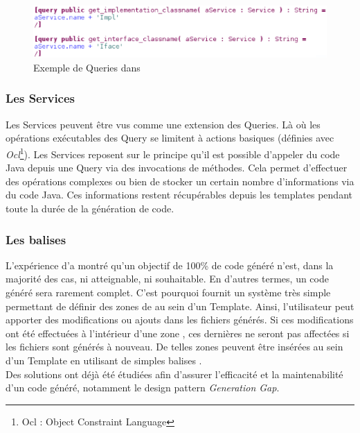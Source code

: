 \begin{figure}[htb]
  \centering
  \includegraphics[scale=0.6]{img/screen_query.eps}
  \caption{Exemple de Queries dans \kwacceleo{}}
  \label{fig:acc_module}
\end{figure}

\subsubsection{Les Services}

Les Services peuvent être vus comme une extension des Queries. Là où les opérations exécutables des Query se limitent à actions basiques (définies avec \textit{Ocl}\footnote{Ocl : Object Constraint Language}). Les Services reposent sur le principe qu'il est possible d'appeler du code Java depuis une Query via des invocations de méthodes. Cela permet d'effectuer des opérations complexes ou bien de stocker un certain nombre d'informations via du code Java. Ces informations restent récupérables depuis les templates pendant toute la durée de la génération de code.

\subsubsection{Les balises }

L'expérience d'\kwobeo a montré qu'un objectif de 100\% de code généré n'est, dans la majorité des cas, ni atteignable, ni souhaitable.
En d'autres termes, un code généré sera rarement complet. C'est pourquoi \kwacceleo fournit un système très simple permettant de définir des zones de  au sein d'un Template. Ainsi, l'utilisateur peut apporter des modifications ou ajouts dans les fichiers générés. Si ces modifications ont été effectuées à l'intérieur d'une zone , ces dernières ne seront pas affectées si les fichiers sont générés à nouveau.
De telles zones peuvent être insérées au sein d'un Template en utilisant de simples balises \guim{\textit{\textbf{[protected]}}}.
\\
Des solutions ont déjà été étudiées afin d'assurer l'efficacité et la maintenabilité d'un code généré, notamment le design pattern \textit{Generation Gap}\cite{gen_gap}.

